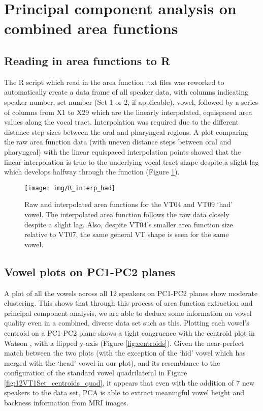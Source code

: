 \section{Principal component analysis on combined area functions}\label{results-pca}

\subsection{Reading in area functions to R}

The R script which read in the area function .txt files was reworked to automatically create a data frame of all speaker data, with columns indicating speaker number, set number (Set 1 or 2, if applicable), vowel, followed by a series of columns from X1 to X29 which are the linearly interpolated, equispaced area values along the vocal tract. Interpolation was required due to the different distance step sizes between the oral and pharyngeal regions. A plot comparing the raw area function data (with uneven distance steps between oral and pharyngeal) with the linear equispaced interpolation points showed that the linear interpolation is true to the underlying vocal tract shape despite a slight lag which develops halfway through the function (Figure \ref{fig:interp-had}).

\begin{figure}[ht]
  \centering
  \texttt{[image: img/R\_interp\_had]}
  \caption{Raw and interpolated area functions for the VT04 and VT09 `had' vowel. The interpolated area function follows the raw data closely despite a slight lag. Also, despite VT04's smaller area function size relative to VT07, the same general VT shape is seen for the same vowel.}
  \label{fig:interp-had}
\end{figure}

\subsection{Vowel plots on PC1-PC2 planes}

A plot of all the vowels across all 12 speakers on PC1-PC2 planes show moderate clustering. This shows that through this process of area function extraction and principal component analysis, we are able to deduce some information on vowel quality even in a combined, diverse data set such as this. Plotting each vowel's centroid on a PC1-PC2 plane shows a tight congruence with the centroid plot in Watson \cite{watson2014mappings}, with a flipped y-axis (Figure \ref{fig:centroids}). Given the near-perfect match between the two plots (with the exception of the `hid' vowel which has merged with the `head' vowel in our plot), and its resemblance to the configuration of the standard vowel quadrilateral in Figure \ref{fig:12VT1Set_centroids_quad}, it appears that even with the addition of 7 new speakers to the data set, PCA is able to extract meaningful vowel height and backness information from MRI images.

